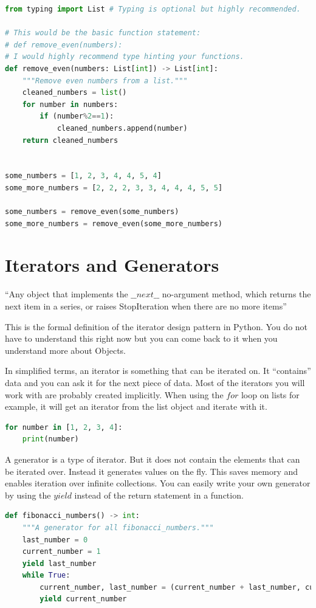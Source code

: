 \documentclass{article}
\newcommand{\qq}[1]{``#1''}
\begin{document}
\begin{lstlisting}[language=python]
from typing import List # Typing is optional but highly recommended.

# This would be the basic function statement:
# def remove_even(numbers):
# I would highly recommend type hinting your functions.
def remove_even(numbers: List[int]) -> List[int]:
    """Remove even numbers from a list."""
    cleaned_numbers = list()
    for number in numbers:
        if (number%2==1):
            cleaned_numbers.append(number)
    return cleaned_numbers
    

some_numbers = [1, 2, 3, 4, 4, 5, 4]
some_more_numbers = [2, 2, 2, 3, 3, 4, 4, 4, 5, 5]

some_numbers = remove_even(some_numbers)
some_more_numbers = remove_even(some_more_numbers)
\end{lstlisting}


\section{Iterators and Generators }\label{generators}

\qq{Any object that implements the $\_\_next\_\_$ no-argument method,
    which returns the next item in a series, or raises StopIteration
    when there are no more items}\cite{Ram2015}

This is the formal definition of the iterator design pattern in Python.
You do not have to understand this right now but you can come back to it when
you understand more about Objects.


In simplified terms, an iterator is something that can be iterated on.
It \qq{contains} data and you can ask it for the next piece of data.
Most of the iterators you will work with are probably created implicitly.
When using the $for$ loop on lists for example, it will get an iterator from the
list object and iterate with it.

\begin{lstlisting}[language=Python]
for number in [1, 2, 3, 4]:
    print(number)
\end{lstlisting}

A generator is a type of iterator.
But it does not contain the elements that can be iterated over.
Instead it generates values on the fly.
This saves memory and enables iteration over infinite collections.
You can easily write your own generator by using the $yield$ instead of the
return statement in a function.

\begin{lstlisting}[language=Python]
def fibonacci_numbers() -> int:
    """A generator for all fibonacci_numbers."""
    last_number = 0
    current_number = 1
    yield last_number
    while True:
        current_number, last_number = (current_number + last_number, current_number)
        yield current_number
\end{lstlisting}
\end{document}
